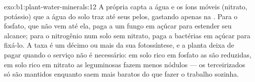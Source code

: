 \begin{solution}{exo:b1:plant-water-minerals:12}
A própria  capta a água e os íons móveis (nitrato, potássio) que a
água do solo traz até seus pelos, gastando  apenas na . Para o fosfato, que não vem até ela, paga a um fungo em
açúcar para estender seu alcance; para o nitrogênio num solo sem
nitrato, paga a bactérias em açúcar para fixá-lo. A taxa é um décimo
ou mais da sua fotossíntese, e a planta deixa de pagar quando o
serviço não é necessário: em solo rico em fosfato as  são
reduzidas, em solo rico em nitrato as leguminosas fazem menos nódulos
--- os terceirizados só são mantidos enquanto saem mais baratos do que
fazer o trabalho sozinha.
\end{solution}


